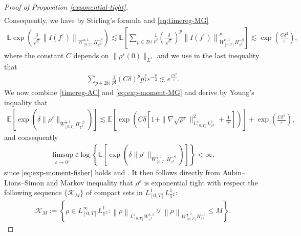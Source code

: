 \begin{proof}[Proof of Proposition \ref{exponential-tight}]
\begin{align*}
\end{align*}
Consequently, we have by Stirling's formula and \eqref{eq:timereg-MG} 
\begin{align}\label{eq:exp-moment-MG}
\mathbb{E}\exp\left(\frac{\delta}{\sqrt{\varepsilon}} \left\|  I(f^{\varepsilon})\right\|_{W_{[0,T]}^{\alpha,1}H_{\mathbb{T}^2}^{-\beta}}\right) \lesssim \mathbb{E}  \left[\sum_{p \in 2\mathbb{N}}\frac{1}{p!} \left(\frac{\delta}{\sqrt{\varepsilon}}\right)^p \left\|  I(f^{\varepsilon})\right\|_{W_{[0,T]}^{\alpha,1}H_{\mathbb{T}^2}^{-\beta}}^p\right] \lesssim \exp\left(\frac{C\delta^2}{\varepsilon}\right),
\end{align}
where the constant $C$ depends on $\|\rho^{\varepsilon}(0)\|_{L^1}$ and we use in the last inequality that 
\begin{align*}
\sum_{p \in 2\mathbb{N}} \frac{1}{p!} (C\delta)^pp^{\frac{p}{2}} \varepsilon^{-\frac{p}{2}} \lesssim e^{\frac{C\delta^2}{\varepsilon}}. 
\end{align*}
We now combine \eqref{timereg-AC} and \eqref{eq:exp-moment-MG} and derive by Young's inquality that 
\begin{align}
\mathbb{E} \left[ \exp \left( \delta \|\rho^{\varepsilon}\|_{W_{[0,T]}^{\frac{1}{3},1}H_{\mathbb{T}^2}^{-\beta}} \right) \right] \lesssim \mathbb{E} \left[ \exp \left( C\delta \left[ 1 + \|\nabla\sqrt{\rho^{\varepsilon}}\|_{L_{[0,T]}^2L^2_{\mathbb{T}^2}}^{2} + \frac{1}{\eta^2}\right] \right) \right] + \exp\left(\frac{C\delta^2}{\varepsilon}\right),
\end{align}
and consequently 
\begin{align}
\limsup_{\varepsilon \to 0^{+}} \varepsilon\log \left\{\mathbb{E} \left[ \exp \left( \delta \|\rho^{\varepsilon}\|_{W_{[0,T]}^{\frac{1}{3},1}H_{\mathbb{T}^2}^{-\beta}} \right) \right]\right\} < \infty, 
\end{align}
since \eqref{eq:exp-moment-fisher} holds and . It then follows directly from Aubin--Lions--Simon \cite{} and Markov inequality that $\rho^{\varepsilon}$ is exponential tight with respect the following sequence $\{\mathcal{K}_M\}$ of compact sets in $L^1_{[0,T]}L^1_{\mathbb{T}^2}$:
\begin{align}
\mathcal{K}_M := \left\{\rho \in L_{[0,T]}^{\infty}L^{1}_{\mathbb{T}^2}: \left\|\rho\right\|_{L_{[0,T]}^{2}W^{1,1}_{\mathbb{T}^2}} \vee \left\|\rho\right\|_{W_{[0,T]}^{\frac{1}{3},1}H^{-3}_{\mathbb{T}^2}} \leq M\right\}.
\end{align}
\end{proof}

